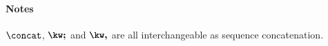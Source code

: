 
\paragraph{Notes}

$\concat$, $\symSemi$ and $\symComma$ are all interchangeable as sequence concatenation.





